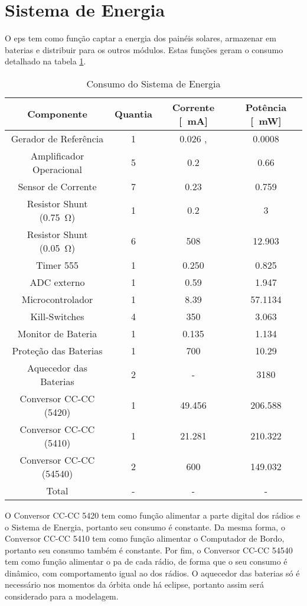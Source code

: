 \section{Sistema de Energia}

O \gls{eps} tem como função captar a energia dos painéis solares, armazenar em baterias e distribuir para os outros módulos. Estas funções geram o consumo detalhado na tabela \ref{consumo_eps}.

\begin{table}[!htpb]
\centering
\begin{tabular}{c c c c}
\\ \hline
Componente & Quantia & Corrente [\SI{}{\milli\ampere}] & Potência [\SI{}{\milli\watt}] \\ \hline \hline
Gerador de Referência & 1 & 0.026 \cite{ref5030}, \cite{msp430f6659} & 0.0008 \cite{ref5030} \\
Amplificador Operacional & 5 & 0.2 \cite{tlv341} & 0.66 \\
Sensor de Corrente & 7 & 0.23 \cite{max9934} & 0.759 \\
Resistor Shunt (\SI{0.75}{\ohm}) & 1 & 0.2 & 3 \\
Resistor Shunt (\SI{0.05}{\ohm}) & 6 & 508 & 12.903 \\
Timer 555 & 1 & 0.250 \cite{lmc555} & 0.825 \\
ADC externo & 1 & 0.59 \cite{ads1248} & 1.947 \\
Microcontrolador & 1 & 8.39 \cite{msp430f6659} & 57.1134 \cite{msp430f6659} \\
Kill-Switches & 4 & 350 & 3.063 \cite{si4403} \\
Monitor de Bateria & 1 & 0.135 \cite{ds2775} & 1.134 \cite{ds2775} \\
Proteção das Baterias & 1 & 700 & 10.29 \cite{fds6898az} \\
Aquecedor das Baterias & 2 & - & 3180\\
Conversor CC-CC (5420) & 1 & 49.456 & 206.588 \cite{tps5420} \\
Conversor CC-CC (5410) & 1 & 21.281 & 210.322 \cite{tps5410} \\
Conversor CC-CC (54540) & 2 & 600 & 149.032 \cite{tps54540} \\ \hline
Total & - & - & - \\ \hline
\end{tabular}
\caption{Consumo do Sistema de Energia}
\label{consumo_eps}
\end{table}

O Conversor CC-CC 5420 tem como função alimentar a parte digital dos rádios e o Sistema de Energia, portanto seu consumo é constante. Da mesma forma, o Conversor CC-CC 5410 tem como função alimentar o Computador de Bordo, portanto seu consumo também é constante. Por fim, o Conversor CC-CC 54540 tem como função alimentar o \gls{pa} de cada rádio, de forma que o seu consumo é dinâmico, com comportamento igual ao dos rádios. O aquecedor das baterias só é necessário nos momentos da órbita onde há eclipse, portanto assim será considerado para a modelagem.

